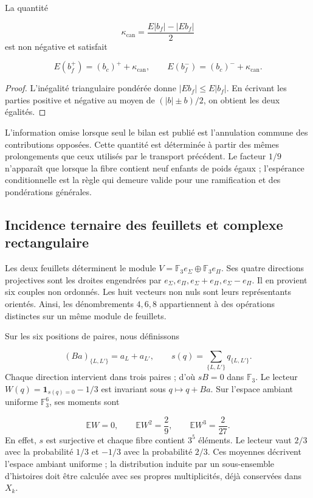 \begin{proposition}
\label{x_reciprocidad:iv:cont:cancelacion}
La quantité

\[
\kappa_{\mathrm{can}}=
\frac{E|b_f|-|Eb_f|}{2}
\]
est non négative et satisfait

\[
E(b_f^+)=(b_c)^++\kappa_{\mathrm{can}},
\qquad
E(b_f^-)=(b_c)^-+\kappa_{\mathrm{can}}.
\]
\end{proposition}
\begin{proof}
L'inégalité triangulaire pondérée donne \(|Eb_f|\leq E|b_f|\). En écrivant les parties positive et négative au moyen de \((|b|\pm b)/2\), on obtient les deux égalités.
\end{proof}

L’information omise lorsque seul le bilan est publié est l’annulation commune des contributions opposées. Cette quantité est déterminée à partir des mêmes prolongements que ceux utilisés par le transport précédent. Le facteur \(1/9\) n’apparaît que lorsque la fibre contient neuf enfants de poids égaux ; l’espérance conditionnelle est la règle qui demeure valide pour une ramification et des pondérations générales.

\subsection{Incidence ternaire des feuillets et complexe rectangulaire}
\label{x_reciprocidad:iv:cont:incidencia-rectangular}
Les deux feuillets déterminent le module \(V=\mathbb F_3e_\Sigma\oplus\mathbb F_3e_\Pi\). Ses quatre directions projectives sont les droites engendrées par \(e_\Sigma,e_\Pi,e_\Sigma+e_\Pi,e_\Sigma-e_\Pi\). Il en provient six couples non ordonnés. Les huit vecteurs non nuls sont leurs représentants orientés. Ainsi, les dénombrements \(4,6,8\) appartiennent à des opérations distinctes sur un même module de feuillets.

Sur les six positions de paires, nous définissons

\[
(Ba)_{\{L,L'\}}=a_L+a_{L'},
\qquad
s(q)=\sum_{\{L,L'\}}q_{\{L,L'\}}.
\]
Chaque direction intervient dans trois paires ; d'où \(sB=0\) dans \(\mathbb F_3\). Le lecteur \(W(q)=\mathbf1_{s(q)=0}-1/3\) est invariant sous \(q\mapsto q+Ba\). Sur l'espace ambiant uniforme \(\mathbb F_3^6\), ses moments sont

\[
\mathbb EW=0,\qquad
\mathbb EW^2=\frac29,\qquad
\mathbb EW^3=\frac2{27}.
\]
En effet, \(s\) est surjective et chaque fibre contient \(3^5\) éléments. Le lecteur vaut \(2/3\) avec la probabilité \(1/3\) et \(-1/3\) avec la probabilité \(2/3\). Ces moyennes décrivent l'espace ambiant uniforme ; la distribution induite par un sous-ensemble d'histoires doit être calculée avec ses propres multiplicités, déjà conservées dans \(X_k\).

